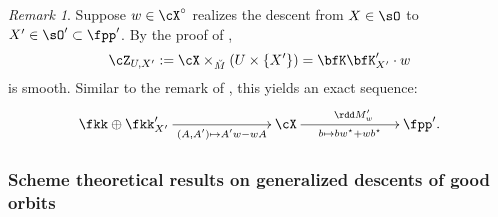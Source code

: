 \documentclass[12pt,a4paper]{amsart}
\numberwithin{equation}{section}
\theoremstyle{remark}
\newtheorem*{remark}{Remark}
\def\Xo{\cX^\circ}
\def\mstar{{\star}}
\begin{document}
\begin{remark}
  Suppose $w\in \Xo$ realizes the descent from $X\in \sO$ to
  $X' \in \sO'\subset \fpp'$.  By the proof of ,
  \[
  \cZ_{U,X'} :=\cX\times_{\dbM}(U\times\{X'\})= \bfK\bfK'_{X'}\cdot w
  \]
  is smooth. Similar to the remark of , this
   yields %
  an exact sequence:
\begin{equation}\label{eq:ES.UD}
\xymatrix@C=7em{
\fkk\oplus \fkk'_{X'} \ar[r]_<>(.5){(A,A') \mapsto A'w - wA}& \cX\ar[r]^{\rdd
  M'_w}_<>(.5){b\mapsto b w^\mstar +wb^\mstar} & \fpp'.\\
}
\end{equation}
\end{remark}



\subsubsection{Scheme theoretical results on generalized descents of good orbits}

\end{document}
